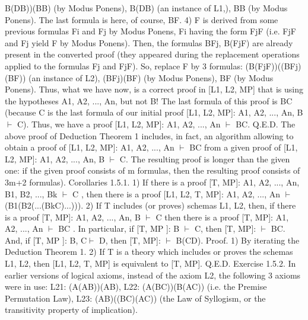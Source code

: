 B\IMPLIES (D\IMPLIES B))\IMPLIES (B\IMPLIES B) (by Modus Ponens),
B\IMPLIES (D\IMPLIES B) (an instance of L1,),
B\IMPLIES B (by Modus Ponens).
The last formula is here, of course, B\IMPLIES F.
4) F is derived from some previous formulas Fi and Fj by Modus Ponens, Fi having the form Fj\IMPLIES F (i.e.
Fj\IMPLIES F and Fj yield F by Modus Ponens). Then, the formulas
B\IMPLIES Fj,
B\IMPLIES (Fj\IMPLIES F)
are already present in the converted proof (they appeared during the replacement operations applied to the
formulas Fj and Fj\IMPLIES F). So, replace F by 3 formulas:
(B\IMPLIES (Fj\IMPLIES F))\IMPLIES ((B\IMPLIES Fj)\IMPLIES (B\IMPLIES F)) (an instance of L2),
(B\IMPLIES Fj)\IMPLIES (B\IMPLIES F) (by Modus Ponens),
B\IMPLIES F (by Modus Ponens).
Thus, what we have now, is a correct proof in [L1, L2, MP] that is using the hypotheses A1, A2, ..., An, but
not B! The last formula of this proof is B\IMPLIES C (because C is the last formula of our initial proof [L1, L2,
MP]: A1, A2, ..., An, B \(\vdash\) C). Thus, we have a proof [L1, L2, MP]: A1, A2, ..., An \(\vdash\) B\IMPLIES C. Q.E.D.
The above proof of Deduction Theorem 1 includes, in fact, an algorithm allowing to obtain a proof of
[L1, L2, MP]: A1, A2, ..., An \(\vdash\) B\IMPLIES C from a given proof of [L1, L2, MP]: A1, A2, ..., An, B \(\vdash\) C. The
resulting proof is longer than the given one: if the given proof consists of m formulas, then the resulting
proof consists of 3m+2 formulas).
Corollaries 1.5.1. 1) If there is a proof [T, MP]: A1, A2, ..., An, B1, B2, ..., Bk \(\vdash\) C , then there is a proof
[L1, L2, T, MP]: A1, A2, ..., An \(\vdash\) (B1\IMPLIES (B2\IMPLIES (...\IMPLIES (Bk\IMPLIES C)...))).
2) If T includes (or proves) schemas L1, L2, then, if there is a proof [T, MP]: A1, A2, ..., An, B \(\vdash\) C then
there is a proof [T, MP]: A1, A2, ..., An \(\vdash\) B\IMPLIES C .
In particular, if [T, MP ]: B \(\vdash\) C, then [T, MP]: \(\vdash\) B\IMPLIES C.
And, if [T, MP ]: B, C\(\vdash\) D, then [T, MP]: \(\vdash\) B\IMPLIES (C\IMPLIES D).
Proof. 1) By iterating the Deduction Theorem 1.
2) If T is a theory which includes or proves the schemas L1, L2, then [L1, L2, T, MP] is equivalent to [T,
MP]. Q.E.D.
Exercise 1.5.2. In earlier versions of logical axioms, instead of the axiom L2, the following 3 axioms
were in use:
L21: (A\IMPLIES (A\IMPLIES B))\IMPLIES (A\IMPLIES B),
L22: (A\IMPLIES (B\IMPLIES C))\IMPLIES (B\IMPLIES (A\IMPLIES C)) (i.e. the Premise Permutation Law),
L23: (A\IMPLIES B)\IMPLIES ((B\IMPLIES C)\IMPLIES (A\IMPLIES C)) (the Law of Syllogism, or the transitivity property of implication).
